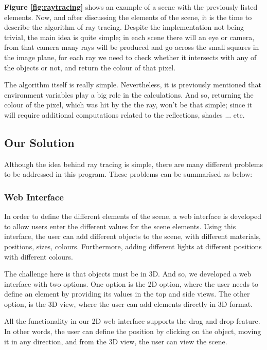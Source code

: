 \documentclass{article}
\begin{document}
	\par \textbf{Figure \ref{fig:raytracing}} shows an example of a scene with the previously listed elements. Now, and after discussing the elements of the scene, it is the time to describe the algorithm of ray tracing. Despite the implementation not being trivial, the main idea is quite simple; in each scene there will an eye or camera, from that camera many rays will be produced and go across the small squares in the image plane, for each ray we need to check whether it intersects with any of the objects or not, and return the colour of that pixel.\\
	\par The algorithm itself is really simple. Nevertheless, it is previously mentioned that environment variables play a big role in the calculations. And so, returning the colour of the pixel, which was hit by the the ray, won't be that simple; since it will require additional computations related to the reflections, shades ... etc. 
	\subsection{Our Solution}
	Although the idea behind ray tracing is simple, there are many different problems to be addressed in this program. These problems can be summarised as below:
	\subsubsection{Web Interface}
	In order to define the different elements of the scene, a web interface is developed to allow users enter the different values for the scene elements. Using this interface, the user can add different objects to the scene, with different materials, positions, sizes, colours. Furthermore, adding different lights at different positions with different colours. \\
	\par The challenge here is that objects must be in 3D. And so, we developed a web interface with two options. One option is the 2D option, where the user needs to define an element by providing its values in the top and side views. The other option, is the 3D view, where the user can add elements directly in 3D format.\\
	\par All the functionality in our 2D web interface supports the drag and drop feature. In other words, the user can define the position by clicking on the object, moving it in any direction, and from the 3D view, the user can view the scene.
\end{document}
